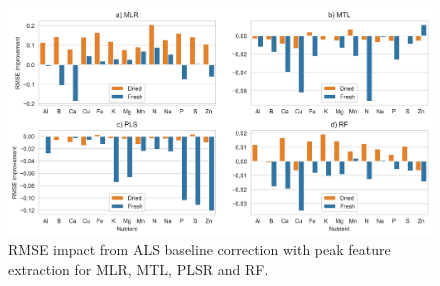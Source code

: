 \documentclass[conference]{IEEEtran}
\begin{document}
\begin{figure}
    \includegraphics[width=\textwidth]{Figures/improvement_all_models.png}
    \caption{RMSE impact from ALS baseline correction with peak feature extraction for MLR, MTL, PLSR and RF.}
    \label{baseline_correction_improvement}
\end{figure}
\end{document}
